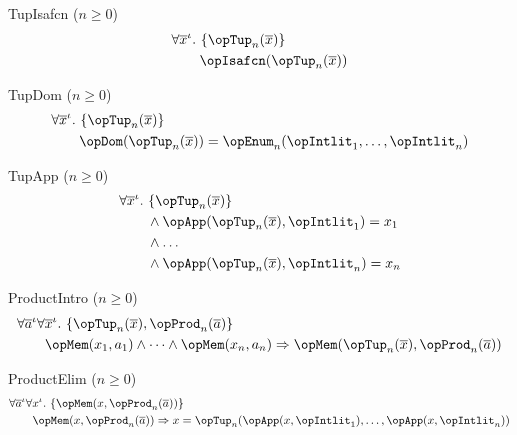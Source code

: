 \documentclass[11pt, a4paper, oneside]{article}
\begin{document}
\begin{axioms}
\item[TupIsafcn ($n \ge 0$)] \[
        \begin{aligned}
            &\forall \overline{x}^\idv.\, \st{ \opTup_n(\overline{x}) } \\
            &\qquad \opIsafcn(\opTup_n(\overline{x}))
        \end{aligned}
    \]

\item[TupDom ($n \ge 0$)] \[
        \begin{aligned}
            &\forall \overline{x}^\idv.\, \st{ \opTup_n(\overline{x}) } \\
            &\qquad \opDom(\opTup_n(\overline{x})) = \opEnum_n(\opIntlit_1, \dots, \opIntlit_n)
        \end{aligned}
    \]

\item[TupApp ($n \ge 0$)] \[
        \begin{aligned}
            &\forall \overline{x}^\idv.\, \st{ \opTup_n(\overline{x}) } \\
            &\qquad \wedge \opApp(\opTup_n(\overline{x}), \opIntlit_1) = x_1 \\
            &\qquad \wedge \dots \\
            &\qquad \wedge \opApp(\opTup_n(\overline{x}), \opIntlit_n) = x_n
        \end{aligned}
    \]

\item[ProductIntro ($n \ge 0$)] \[
        \begin{aligned}
            &\forall \overline{a}^\idv \forall \overline{x}^\idv.\, \st{ \opTup_n(\overline{x}), \opProd_n(\overline{a}) } \\
            &\qquad \opMem(x_1, a_1) \wedge \dots \wedge \opMem(x_n, a_n) \imp \opMem(\opTup_n(\overline{x}), \opProd_n(\overline{a}))
        \end{aligned}
    \]

\item[ProductElim ($n \ge 0$)] \[
        \begin{aligned}
            &\forall \overline{a}^\idv \forall x^\idv.\, \st{ \opMem(x, \opProd_n(\overline{a})) } \\
            &\qquad \opMem(x, \opProd_n(\overline{a})) \imp x = \opTup_n(\opApp(x, \opIntlit_1), \dots, \opApp(x, \opIntlit_n))
        \end{aligned}
    \]


\end{axioms}
\end{document}
